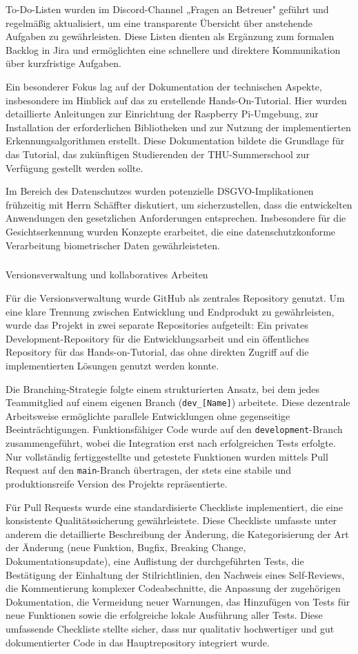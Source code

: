 To-Do-Listen wurden im Discord-Channel „Fragen an Betreuer" geführt und regelmäßig aktualisiert, um eine transparente Übersicht über anstehende Aufgaben zu gewährleisten. Diese Listen dienten als Ergänzung zum formalen Backlog in Jira und ermöglichten eine schnellere und direktere Kommunikation über kurzfristige Aufgaben.

Ein besonderer Fokus lag auf der Dokumentation der technischen Aspekte, insbesondere im Hinblick auf das zu erstellende Hands-On-Tutorial. Hier wurden detaillierte Anleitungen zur Einrichtung der Raspberry Pi-Umgebung, zur Installation der erforderlichen Bibliotheken und zur Nutzung der implementierten Erkennungsalgorithmen erstellt. Diese Dokumentation bildete die Grundlage für das Tutorial, das zukünftigen Studierenden der THU-Summerschool zur Verfügung gestellt werden sollte.

Im Bereich des Datenschutzes wurden potenzielle DSGVO-Implikationen frühzeitig mit Herrn Schäffter diskutiert, um sicherzustellen, dass die entwickelten Anwendungen den gesetzlichen Anforderungen entsprechen. Insbesondere für die Gesichtserkennung wurden Konzepte erarbeitet, die eine datenschutzkonforme Verarbeitung biometrischer Daten gewährleisteten.

\subparagraph{}{Versionsverwaltung und kollaboratives Arbeiten}

Für die Versionsverwaltung wurde GitHub als zentrales Repository genutzt. Um eine klare Trennung zwischen Entwicklung und Endprodukt zu gewährleisten, wurde das Projekt in zwei separate Repositories aufgeteilt: Ein privates Development-Repository für die Entwicklungsarbeit und ein öffentliches Repository für das Hands-on-Tutorial, das ohne direkten Zugriff auf die implementierten Lösungen genutzt werden konnte.

Die Branching-Strategie folgte einem strukturierten Ansatz, bei dem jedes Teammitglied auf einem eigenen Branch (\texttt{dev\_[Name]}) arbeitete. Diese dezentrale Arbeitsweise ermöglichte parallele Entwicklungen ohne gegenseitige Beeinträchtigungen. Funktionsfähiger Code wurde auf den \texttt{development}-Branch zusammengeführt, wobei die Integration erst nach erfolgreichen Tests erfolgte. Nur vollständig fertiggestellte und getestete Funktionen wurden mittels Pull Request auf den \texttt{main}-Branch übertragen, der stets eine stabile und produktionsreife Version des Projekts repräsentierte.

Für Pull Requests wurde eine standardisierte Checkliste implementiert, die eine konsistente Qualitätssicherung gewährleistete. Diese Checkliste umfasste unter anderem die detaillierte Beschreibung der Änderung, die Kategorisierung der Art der Änderung (neue Funktion, Bugfix, Breaking Change, Dokumentationsupdate), eine Auflistung der durchgeführten Tests, die Bestätigung der Einhaltung der Stilrichtlinien, den Nachweis eines Self-Reviews, die Kommentierung komplexer Codeabschnitte, die Anpassung der zugehörigen Dokumentation, die Vermeidung neuer Warnungen, das Hinzufügen von Tests für neue Funktionen sowie die erfolgreiche lokale Ausführung aller Tests. Diese umfassende Checkliste stellte sicher, dass nur qualitativ hochwertiger und gut dokumentierter Code in das Hauptrepository integriert wurde.

